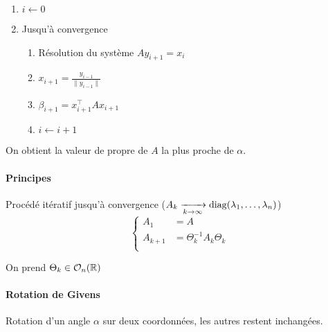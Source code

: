 \documentclass{article}
\begin{document}
\begin{enumerate}
	\item $i\leftarrow 0$
	 \item Jusqu'à convergence 
		 \begin{enumerate}
		 	\item Résolution du système $A y_{i+1} = x_i$
			\item $x_{i+1} = \displaystyle\frac{y_{i-1}}{\| y_{i-1} \|}$ 
			\item $\beta_{i+1} = x_{i+1}^\top A x_{i+1}$
			\item $i \leftarrow i + 1$
		 \end{enumerate}
\end{enumerate}

On obtient la valeur de propre de $A$ la plus proche de  $\alpha$.

\begin{theorem}
	
	\paragraph{Principes}
	Procédé itératif jusqu'à convergence ($A_k \xrightarrow[k\to \infty]{} \operatorname{diag}(\lambda_1, \ldots, \lambda_n)$)
	\[
		\begin{cases}
			A_1 &= A \\
			A_{k+1} &= \Theta_k^{-1} A_k \Theta_k \\
		\end{cases}
	\] 

	On prend $\Theta_k \in \mathcal{O}_n(\mathbb{R})$ 
\end{theorem}

\paragraph{Rotation de Givens}

Rotation d'un angle $\alpha$ sur deux coordonnées, les autres restent inchangées.
\end{document}
